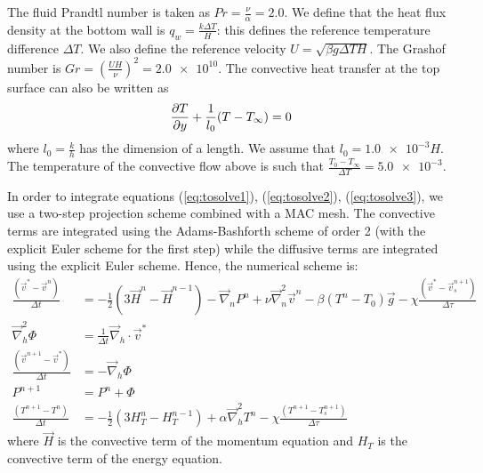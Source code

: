 \documentclass[a4paper,10pt]{scrartcl}
\newcommand\partiald[3]{\frac{\partial\ifnum#1>1 ^{#1}\fi #2}{\partial #3\ifnum#1>1 ^{#1}\fi}}
\newcommand\lapl{\vec{\nabla}^2}
\newcommand\grad{\vec{\nabla}}
\begin{document}
The fluid Prandtl number is taken as $Pr = \frac{\nu}{\alpha} = 2.0$. We define that the heat flux density at the bottom wall is $q_w = \frac{k\Delta T}{H}$: this defines the reference temperature difference $\Delta T$. We also define the reference velocity $U=\sqrt{\beta g\Delta TH}$. The Grashof number is $Gr = \left(\frac{UH}{\nu}\right)^2 = \num{2.0e10}$. The convective heat transfer at the top surface can also be written as
\begin{equation} \partiald{1}{T}{y} + \frac{1}{l_0}(T-T_\infty) = 0 \end{equation}
where $l_0 = \frac{k}{h}$ has the dimension of a length. We assume that $l_0 = \num{1.0e-3}H$. The temperature of the convective flow above is such that $\frac{T_0-T_\infty}{\Delta T} = \num{5.0e-3}$.

In order to integrate equations (\ref{eq:tosolve1}), (\ref{eq:tosolve2}), (\ref{eq:tosolve3}), we use a two-step projection scheme combined with a MAC mesh. The convective terms are integrated using the Adams-Bashforth scheme of order 2 (with the explicit Euler scheme for the first step) while the diffusive terms are integrated using the explicit Euler scheme. Hence, the numerical scheme is:
\begin{align}
    \frac{(\vec{v}^*-\vec{v}^n)}{\Delta t} &= -\frac{1}{2}(3\vec{H}^n-\vec{H}^{n-1}) - \grad_nP^n + \nu\lapl_n\vec{v}^n - \beta(T^n-T_0)\vec{g} - \chi\frac{(\vec{v}^*-\vec{v}_s^{n+1})}{\Delta\tau} \label{eq:flow_solving1}\\
    \lapl_h\Phi &= \frac{1}{\Delta t}\vec{\nabla}_h\cdot\vec{v}^* \label{eq:poisson}\\
    \frac{(\vec{v}^{n+1}-\vec{v}^*)}{\Delta t} &= -\grad_h\Phi \\
    P^{n+1} &= P^n + \Phi \\
    \frac{(T^{n+1}-T^n)}{\Delta t} &= -\frac{1}{2}(3H^n_T - H^{n-1}_T) + \alpha\lapl_hT^n - \chi\frac{(T^{n+1}-T_s^{n+1})}{\Delta\tau}
\end{align}
where $\vec{H}$ is the convective term of the momentum equation and $H_T$ is the convective term of the energy equation.
\end{document}
